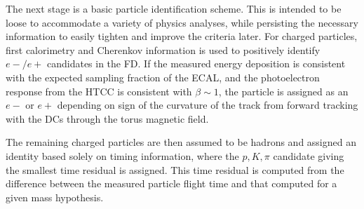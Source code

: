     The next stage is a basic particle identification scheme.
    This is intended to be loose to accommodate a variety of physics analyses, while persisting the necessary information to easily tighten and improve the criteria later.
    For charged particles, first calorimetry and Cherenkov information is used to positively identify $e-/e+$ candidates in the FD.
    If the measured energy deposition is consistent with the expected sampling fraction of the ECAL, and the photoelectron response from the HTCC is consistent with $\beta \sim 1$, the particle is assigned as an $e-$ or $e+$ depending on sign of the curvature of the track from forward tracking with the DCs through the torus magnetic field.

    The remaining charged particles are then assumed to be hadrons and assigned an identity based solely on timing information, where the $p,K,\pi$ candidate giving the smallest time residual is assigned.
    This time residual is computed from the difference between the measured particle flight time and that computed for a given mass hypothesis.

